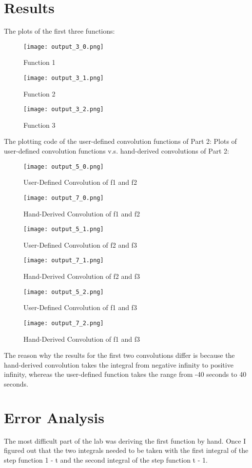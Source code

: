 \documentclass[12pt]{article}
\begin{document}
\section{Results}
The plots of the first three functions:
\begin{figure}[H]
\texttt{[image: output\_3\_0.png]}
  \caption{Function 1}
  \end{figure}
\begin{figure}[H]
\texttt{[image: output\_3\_1.png]}
  \caption{Function 2}
  \end{figure}
  \begin{figure}[H]
\texttt{[image: output\_3\_2.png]}
  \caption{Function 3}
  \end{figure}
The plotting code of the user-defined convolution functions of Part 2:
Plots of user-defined convolution functions v.s. hand-derived convolutions of Part 2:
\begin{figure}[H]
\texttt{[image: output\_5\_0.png]}
  \caption{User-Defined Convolution of f1 and f2}
  \end{figure}
\begin{figure}[H]
\texttt{[image: output\_7\_0.png]}
  \caption{Hand-Derived Convolution of f1 and f2}
  \end{figure}  
\begin{figure}[H]
\texttt{[image: output\_5\_1.png]}
  \caption{User-Defined Convolution of f2 and f3}
  \end{figure} 
  \begin{figure}[H]
\texttt{[image: output\_7\_1.png]}
  \caption{Hand-Derived Convolution of f2 and f3}
  \end{figure}  
\begin{figure}[H]
\texttt{[image: output\_5\_2.png]}
  \caption{User-Defined Convolution of f1 and f3}
  \end{figure}
  \begin{figure}[H]
\texttt{[image: output\_7\_2.png]}
  \caption{Hand-Derived Convolution of f1 and f3}
  \end{figure}  
The reason why the results for the first two convolutions differ is because the hand-derived convolution takes the integral from negative infinity to positive infinity, whereas the user-defined function takes the range from -40 seconds to 40 seconds.

\section{Error Analysis}
The most difficult part of the lab was deriving the first function by hand. Once I figured out that the two integrals needed to be taken with the first integral of the step function 1 - t and the second integral of the step function t - 1.
\end{document}

